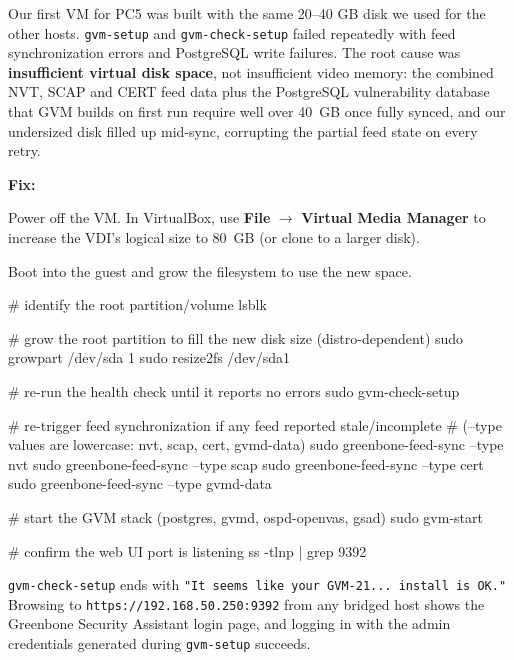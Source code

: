 \documentclass[11pt,a4paper]{article}
\begin{document}
\begin{troublebox}
Our first VM for PC5 was built with the same 20--40 GB disk we used for the other
hosts. \texttt{gvm-setup} and \texttt{gvm-check-setup} failed repeatedly with feed
synchronization errors and PostgreSQL write failures. The root cause was
\textbf{insufficient virtual disk space}, not insufficient video memory: the combined
NVT, SCAP and CERT feed data plus the PostgreSQL vulnerability database that GVM builds
on first run require well over 40~GB once fully synced, and our undersized disk filled
up mid-sync, corrupting the partial feed state on every retry.

\textbf{Fix:}
\begin{steps}
\item Power off the VM. In VirtualBox, use \textbf{File} $\to$ \textbf{Virtual Media
  Manager} to increase the VDI's logical size to 80~GB (or clone to a larger disk).
\item Boot into the guest and grow the filesystem to use the new space.
\end{steps}
\begin{cmdverb}
# identify the root partition/volume
lsblk

# grow the root partition to fill the new disk size (distro-dependent)
sudo growpart /dev/sda 1
sudo resize2fs /dev/sda1

# re-run the health check until it reports no errors
sudo gvm-check-setup

# re-trigger feed synchronization if any feed reported stale/incomplete
# (--type values are lowercase: nvt, scap, cert, gvmd-data)
sudo greenbone-feed-sync --type nvt
sudo greenbone-feed-sync --type scap
sudo greenbone-feed-sync --type cert
sudo greenbone-feed-sync --type gvmd-data
\end{cmdverb}
\end{troublebox}

\begin{cmdbox}
\begin{cmdverb}
# start the GVM stack (postgres, gvmd, ospd-openvas, gsad)
sudo gvm-start

# confirm the web UI port is listening
ss -tlnp | grep 9392
\end{cmdverb}
\end{cmdbox}

\begin{expectbox}
\texttt{gvm-check-setup} ends with \texttt{"It seems like your GVM-21... install is
OK."} Browsing to \texttt{https://192.168.50.250:9392} from any bridged host shows the
Greenbone Security Assistant login page, and logging in with the admin credentials
generated during \texttt{gvm-setup} succeeds.
\end{expectbox}
\end{document}
